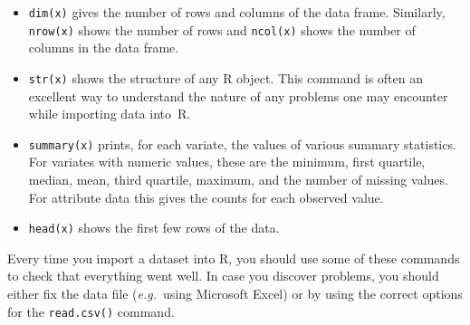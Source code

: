 \documentclass[
  a4paper,
]{article}
\theoremstyle{definition}
\theoremstyle{definition}
\theoremstyle{definition}
\theoremstyle{definition}
\theoremstyle{remark}
\begin{document}
\begin{itemize}
\item
  \texttt{dim(x)} gives the number of rows and columns of the data
  frame. Similarly, \texttt{nrow(x)} shows the number of rows
  and \texttt{ncol(x)} shows the number of columns in the data frame.
\item
  \texttt{str(x)} shows the structure of any R object. This command
  is often an excellent way to understand the nature of any problems
  one may encounter while importing data into~R.
\item
  \texttt{summary(x)} prints, for each variate, the values of
  various summary statistics. For variates with numeric values,
  these are the minimum, first quartile, median, mean, third quartile,
  maximum, and the number of missing values. For attribute data
  this gives the counts for each observed value.
\item
  \texttt{head(x)} shows the first few rows of the data.
\end{itemize}

Every time you import a dataset into R, you should use some
of these commands to check that everything went well.
In case you discover problems, you should either fix the data file
(\emph{e.g.}~using Microsoft Excel) or by using the correct options
for the \texttt{read.csv()} command.
\end{document}
